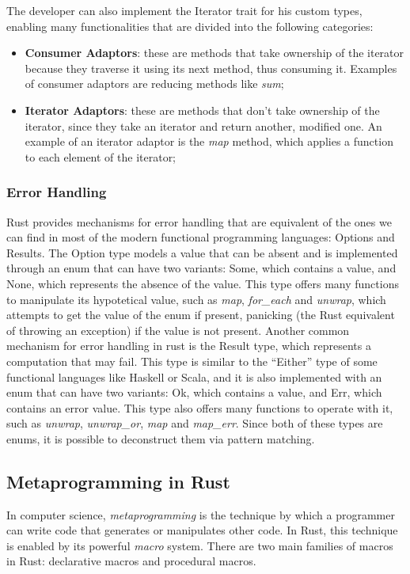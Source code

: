 The developer can also implement the Iterator trait for his custom types, enabling many functionalities that are divided into the following categories:

\begin{itemize}
    \item \textbf{Consumer Adaptors}: these are methods that take ownership of the iterator because they traverse it using its next method, thus consuming it. Examples of consumer adaptors are reducing methods like \textit{sum};
    \item \textbf{Iterator Adaptors}: these are methods that don't take ownership of the iterator, since they take an iterator and return another, modified one. An example of an iterator adaptor is the \textit{map} method, which applies a function to each element of the iterator;
\end{itemize}

\subsubsection{Error Handling}
Rust provides mechanisms for error handling that are equivalent of the ones we can find in most of the modern functional programming languages: Options and Results.
The Option type models a value that can be absent and is implemented through an enum that can have two variants: Some, which contains a value, and None, which represents the absence of the value.
This type offers many functions to manipulate its hypotetical value, such as \textit{map}, \textit{for\_each} and \textit{unwrap}, which attempts to get the value of the enum if present, panicking (the Rust
equivalent of throwing an exception) if the value is not present.
Another common mechanism for error handling in rust is the Result type, which represents a computation that may fail. This type is similar to the ``Either'' type of some functional languages like Haskell or Scala,
and it is also implemented with an enum that can have two variants: Ok, which contains a value, and Err, which contains an error value. This type also offers many functions to operate with it, such as
\textit{unwrap}, \textit{unwrap\_or}, \textit{map} and \textit{map\_err}.
Since both of these types are enums, it is possible to deconstruct them via pattern matching.

\subsection{Metaprogramming in Rust}
In computer science, \textit{metaprogramming} is the technique by which a programmer can write code that generates or manipulates other code. In Rust, this technique is enabled
by its powerful \textit{macro} system. There are two main families of macros in Rust: declarative macros and procedural macros.

